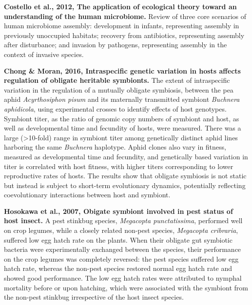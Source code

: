 \documentclass[11pt]{article}
\begin{document}
\begin{sloppypar}
\par

\textbf{Costello et al., 2012, The application of ecological theory toward an understanding of the human microbiome.} \newline
Review of three core scenarios of human microbiome assembly: 
development in infants, representing assembly in previously unoccupied habitats; 
recovery from antibiotics, representing assembly after disturbance; 
and invasion by pathogens, representing assembly in the context of invasive species. 

\par

\textbf{Chong & Moran, 2016, Intraspecific genetic variation in hosts affects regulation of obligate heritable symbionts.} \newline
The extent of intraspecific variation in the regulation of a mutually obligate symbiosis, between the pea aphid \textit{Acyrthosiphon pisum} and its maternally transmitted symbiont \textit{Buchnera aphidicola}, using experimental crosses to identify effects of host genotypes. 
Symbiont titer, as the ratio of genomic copy numbers of symbiont and host, as well as developmental time and fecundity of hosts, were measured. 
There was a large (>10-fold) range in symbiont titer among genetically distinct aphid lines harboring the same \textit{Buchnera} haplotype. 
Aphid clones also vary in fitness, measured as developmental time and fecundity, and genetically based variation in titer is correlated with host fitness, with higher titers corresponding to lower reproductive rates of hosts. 
The results show that obligate symbiosis is not static but instead is subject to short-term evolutionary dynamics, potentially reflecting coevolutionary interactions between host and symbiont.

\textbf{Hosokawa et al., 2007, Obigate symbiont involved in pest status of host insect.} \newline
A pest stinkbug species, \textit{Megacopta punctatissima}, performed well on crop legumes, while a closely related non-pest species, \textit{Megacopta cribraria}, suffered low egg hatch rate on the plants. 
When their obligate gut symbiotic bacteria were experimentally exchanged between the species, their performance on the crop legumes was completely reversed: 
the pest species suffered low egg hatch rate, whereas the non-pest species restored normal egg hatch rate and showed good performance. 
The low egg hatch rates were attributed to nymphal mortality before or upon hatching, which were associated with the symbiont from the non-pest stinkbug irrespective of the host insect species.


\end{sloppypar}
\end{document}
